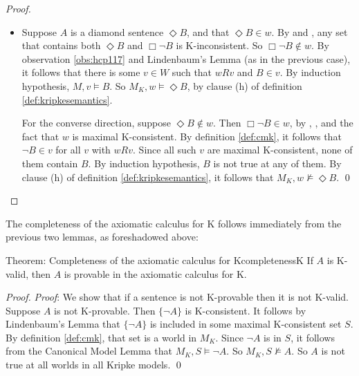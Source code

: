 \begin{proof}
\begin{itemize}
          For the converse direction, suppose $\Box B \not\in w$. Let $\Gamma^-$
          be the set of all sentences $C$ for which $\Box C \in w$. By
          observation \ref{obs:hcp117}, $\Gamma^- \cup \{ \neg B \}$ is
          K-consistent. By definition \ref{def:cmk} and Lindenbaum's Lemma, it
          follows that there is some $v\in W$ such that $wRv$ and
          $\neg B \in v$. Since $v$ is K-consistent, $B \not\in v$. By induction
          hypothesis, it follows that $M_K,v \not\models B$. And so
          $M_K,w \not\models \Box B$, by clause (g) of definition
          \ref{def:kripkesemantics}.
          
    \item Suppose $A$ is a diamond sentence $\Diamond B$, and that
          $\Diamond B \in w$. By  and , any set that contains
          both $\Diamond B$ and $\Box \neg B$ is K-inconsistent. So
          $\Box \neg B \not\in w$. By observation \ref{obs:hcp117} and
          Lindenbaum's Lemma (as in the previous case), it follows that there is
          some $v\in W$ such that $wRv$ and $B \in v$. By induction hypothesis,
          $M,v\models B$. So $M_{K},w\models \Diamond B$, by clause (h) of
          definition \ref{def:kripkesemantics}.

          For the converse direction, suppose $\Diamond B \not\in w$. Then
          $\Box \neg B \in w$, by , , and the fact that $w$ is
          maximal K-consistent. By definition \ref{def:cmk}, it follows that
          $\neg B\in v$ for all $v$ with $wRv$. Since all such $v$ are maximal
          K-consistent, none of them contain $B$. By induction hypothesis, $B$
          is not true at any of them. By clause (h) of definition
          \ref{def:kripkesemantics}, it follows that
          $M_{K}, w \not\models \Diamond B$. \qed
  \end{itemize}
\end{proof}

The completeness of the axiomatic calculus for K follows immediately from the
previous two lemmas, as foreshadowed above:

\begin{theorem}{Theorem: Completeness of the axiomatic calculus for K}{completenessK}
  If $A$ is K-valid, then $A$ is provable in the axiomatic calculus for K.
\end{theorem}
%
\begin{proof}
  \emph{Proof}: We show that if a sentence is not K-provable then it is not
  K-valid. Suppose $A$ is not K-provable. Then $\{ \neg A \}$ is K-consistent.
  It follows by Lindenbaum's Lemma that $\{ \neg A \}$ is included in some
  maximal K-consistent set $S$. By definition \ref{def:cmk}, that set is a world
  in $M_K$. Since $\neg A$ is in $S$, it follows from the Canonical Model Lemma
  that $M_K,S \models \neg A$. So $M_K,S \not\models A$. So $A$ is not true at
  all worlds in all Kripke models. \qed
\end{proof}

